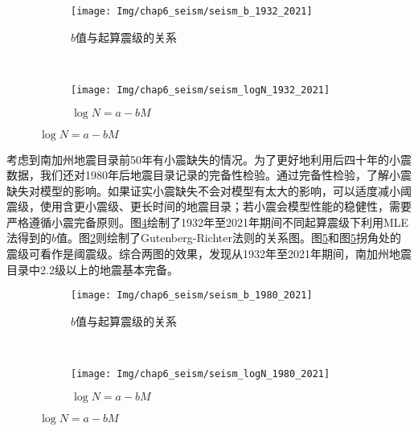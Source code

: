 \begin{figure}[!htbp]
  \centering
  \begin{subfigure}[b]{0.4\textwidth}
    \caption{$b$值与起算震级的关系} 
    \texttt{[image: Img/chap6\_seism/seism\_b\_1932\_2021]}
    \label{fig:seism_b_m_1932_2021}
  \end{subfigure}   
  ~
  \begin{subfigure}[b]{0.4\textwidth}
      \caption{$\log N=a-bM$}
      \texttt{[image: Img/chap6\_seism/seism\_logN\_1932\_2021]}
      \label{fig:seism_logn_m_1932_2021}
  \end{subfigure}
  \vspace{-1cm}
  \label{fig:seism_mc_1932_2021}
\end{figure}

考虑到南加州地震目录前50年有小震缺失的情况。为了更好地利用后四十年的小震数据，我们还对1980年后地震目录记录的完备性检验。通过完备性检验，了解小震缺失对模型的影响。如果证实小震缺失不会对模型有太大的影响，可以适度减小阈震级，使用含更小震级、更长时间的地震目录；若小震会模型性能的稳健性，需要严格遵循小震完备原则。图\ref{fig:seism_b_m_1980_2021}绘制了1932年至2021年期间不同起算震级下利用MLE法得到的$b$值。图\ref{fig:seism_logn_m_1932_2021}则绘制了Gutenberg-Richter法则的关系图。图\ref{fig:seism_logn_m_1980_2021}和图\ref{fig:seism_logn_m_1980_2021}拐角处的震级可看作是阈震级。综合两图的效果，发现从1932年至2021年期间，南加州地震目录中2.2级以上的地震基本完备。

\begin{figure}[!htbp]
  \centering
  \begin{subfigure}[b]{0.4\textwidth}
    \caption{$b$值与起算震级的关系} 
    \texttt{[image: Img/chap6\_seism/seism\_b\_1980\_2021]}
    \label{fig:seism_b_m_1980_2021}
  \end{subfigure}   
  ~
  \begin{subfigure}[b]{0.4\textwidth}
    \caption{$\log N=a-bM$}
    \texttt{[image: Img/chap6\_seism/seism\_logN\_1980\_2021]}
    \label{fig:seism_logn_m_1980_2021}
  \end{subfigure}
  \vspace{-1cm}
  \label{fig:seism_mc_1980_2021}
\end{figure}

